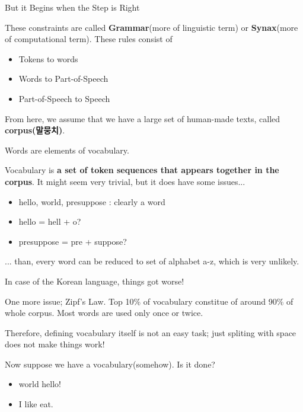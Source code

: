 \documentclass{beamer}
\begin{document}
\begin{frame}[allowframebreaks]{But it Begins when the Step is Right}

These constraints are called \textbf{Grammar}(more of linguistic term) or \textbf{Synax}(more of computational term). These rules consist of

\begin{itemize}
\item Tokens to words
\item Words to Part-of-Speech
\item Part-of-Speech to Speech
\end{itemize}

From here, we assume that we have a large set of human-made texts, called \textbf{corpus(말뭉치)}.
\framebreak

Words are elements of vocabulary.

Vocabulary is \textbf{a set of token sequences that appears together in the corpus}. It might seem very trivial, but it does have some issues...

\begin{itemize}
\item hello, world, presuppose : clearly a word
\item hello = hell + o?
\item presuppose = pre + suppose?
\end{itemize}

... than, every word can be reduced to set of alphabet a-z, which is very unlikely.


\framebreak


In case of the Korean language, things got worse!


\framebreak

One more issue; Zipf's Law. Top 10\% of vocabulary constitue of around 90\% of whole corpus. Most words are used only once or twice.

Therefore, defining vocabulary itself is not an easy task; just spliting with space does not make things work!

\framebreak

Now suppose we have a vocabulary(somehow). Is it done?

\begin{itemize}
\item world hello!
\item I like eat.
\end{itemize}


\end{frame}
\end{document}
